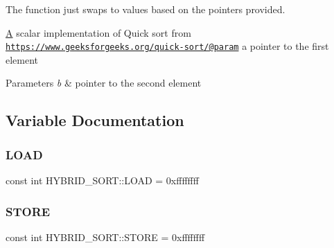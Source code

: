 The function just swaps to values based on the pointers provided. 

\mbox{\hyperlink{classA}{A}} scalar implementation of Quick sort from \href{https://www.geeksforgeeks.org/quick-sort/@param}{\tt https\+://www.\+geeksforgeeks.\+org/quick-\/sort/@param} a pointer to the first element 
\begin{DoxyParams}{Parameters}
{\em b} & pointer to the second element \\
\hline
\end{DoxyParams}


\subsection{Variable Documentation}
\mbox{\label{namespaceHYBRID__SORT_a08bb817ae8599c88d4e11cc3496d7ed2}} 
\subsubsection{\texorpdfstring{L\+O\+AD}{LOAD}}
{\footnotesize\ttfamily const int H\+Y\+B\+R\+I\+D\+\_\+\+S\+O\+R\+T\+::\+L\+O\+AD = 0xffffffff\hspace{0.3cm}{\ttfamily [static]}}

\mbox{\label{namespaceHYBRID__SORT_a84b175b9bd35bd54e294de8488a8acd3}} 
\subsubsection{\texorpdfstring{S\+T\+O\+RE}{STORE}}
{\footnotesize\ttfamily const int H\+Y\+B\+R\+I\+D\+\_\+\+S\+O\+R\+T\+::\+S\+T\+O\+RE = 0xffffffff\hspace{0.3cm}{\ttfamily [static]}}

